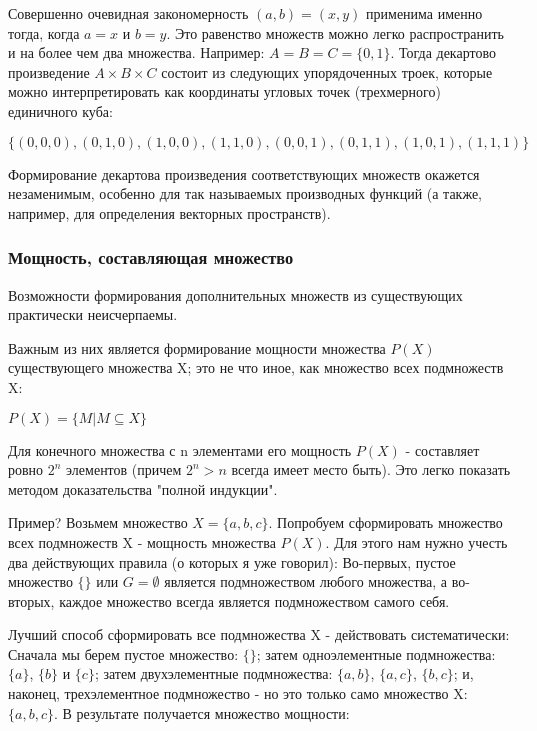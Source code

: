 Совершенно очевидная закономерность \((a,b)=(x,y)\) применима именно тогда, когда \(a=x\) и \(b=y\). Это равенство множеств можно легко распространить и на более чем два множества. Например: \(A=B=C=\{0,1\}\). Тогда декартово произведение \(A \times B \times C\) состоит из следующих упорядоченных троек, которые можно интерпретировать как координаты угловых точек (трехмерного) единичного куба:

\vspace{0.5cm}
\(\{(0,0,0),(0,1,0),(1,0,0),(1,1,0),(0,0,1),(0,1,1),(1,0,1),(1,1,1)\}\)

\vspace{0.5cm}
Формирование декартова произведения соответствующих множеств окажется незаменимым, особенно для так называемых производных функций (а также, например, для определения векторных пространств).

\subsubsection{Мощность, составляющая множество}
Возможности формирования дополнительных множеств из существующих практически неисчерпаемы.

Важным из них является формирование мощности множества \(P(X)\) существующего множества X; это не что иное, как множество всех подмножеств X:

\vspace{0.5cm}
\(P(X)=\{M|M \subseteq X\}\)

\vspace{0.5cm}

Для конечного множества с n элементами его мощность \(P(X)\) - составляет ровно \(2^n\) элементов (причем \(2^n > n\) всегда имеет место быть). Это легко показать методом доказательства "полной индукции".

Пример? Возьмем множество \(X=\{a,b,c\}\). Попробуем сформировать множество всех подмножеств X - мощность множества \(P(X)\). Для этого нам нужно учесть два действующих правила (о которых я уже говорил): Во-первых, пустое множество \(\{\}\) или \(G=\emptyset\) является подмножеством любого множества, а во-вторых, каждое множество всегда является подмножеством самого себя.

Лучший способ сформировать все подмножества X - действовать систематически: Сначала мы берем пустое множество: \(\{\}\); затем одноэлементные подмножества: \(\{a\}\), \(\{b\}\) и \(\{c\}\); затем двухэлементные подмножества: \(\{a,b\}\), \(\{a,c\}\), \(\{b,c\}\); и, наконец, трехэлементное подмножество - но это только само множество X: \(\{a,b,c\}\). В результате получается множество мощности:

